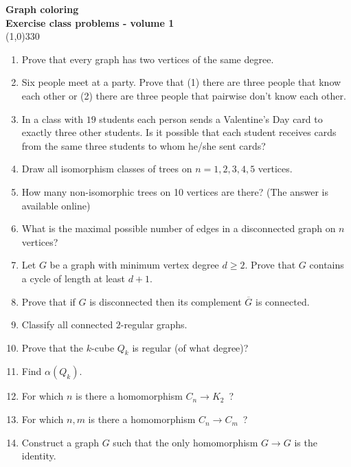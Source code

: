 \documentclass[a4paper]{article}
\begin{document}
\pagestyle{empty}
\begin{center}
	{\Large\bf Graph coloring}\\
	{\large\bf Exercise class problems - volume 1}\\
	\line(1,0){330}
\end{center}

\begin{enumerate}
\item Prove that every graph has two vertices of the same degree.
\item Six people meet at a party. Prove that (1) there are three people that know each other or (2) there are three people that pairwise don't know each other.
\item In a class with $19$ students each person sends a Valentine's Day card to exactly three other students. Is it possible that each student receives cards from the same three students to whom he/she sent cards?
\item Draw all isomorphism classes of trees on $n=1,2,3,4,5$ vertices.
\item How many non-isomorphic trees on 10 vertices are there? (The answer is available online)
\item What is the maximal possible number of edges in a disconnected graph on $n$ vertices?
\item Let $G$ be a graph with minimum vertex degree $d\geq 2$. Prove that $G$ contains a cycle of length at least $d+1$.
\item Prove that if $G$ is disconnected then its complement $\overline{G}$ is connected.
\item Classify all connected $2$-regular graphs.
\item Prove that the $k$-cube $Q_k$ is regular (of what degree)?
\item Find $\alpha(Q_k)$.
\item For which $n$ is there a homomorphism $C_n\to K_2$\ ?
\item For which $n,m$ is there a homomorphism $C_n\to C_m$\ ?
\item Construct a graph $G$ such that the only homomorphism $G\to G$ is the identity.

\end{enumerate}
\end{document}
